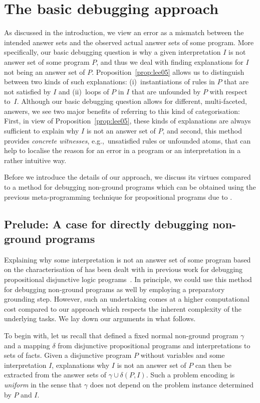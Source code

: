 \documentclass{tlp}
\newcommand{\wrt}{with respect to}
\newcommand{\egc}{e.g.,\ }
\begin{document}
\section{The basic debugging approach}

As discussed in the introduction, 
we view  an error as a mismatch between the intended answer sets and the observed actual answer sets of some program. 
More specifically, our basic debugging question is why a given interpretation $I$ is not answer set of some program $P$, and
thus we deal with  finding explanations for $I$ not being an answer set of $P$.
Proposition~\ref{prop:lee05} allows us to distinguish between two kinds of such explanations:
(i)~instantiations of rules in $P$ that are not satisfied by $I$ and (ii)~loops of $P$ in $I$ that are unfounded by $P$ \wrt\ $I$.
Although our basic debugging question
allows for different, multi-faceted, answers,
we see two major benefits of referring to this kind of  categorisation:
First, in view of Proposition~\ref{prop:lee05}, these kinds of explanations are
always sufficient to explain why $I$ is not an answer set of $P$, and second,
this method provides \emph{concrete witnesses}, \egc unsatisfied rules or unfounded atoms,
that can help to localise the reason for an error in a program or an interpretation in a rather intuitive way.

Before we introduce the details of our approach, we discuss its virtues compared to a method for debugging non-ground programs which can be obtained using the previous meta-programming technique for propositional programs due to .

\subsection{Prelude: A case for directly debugging non-ground programs}

Explaining why some interpretation is not an answer set of some program based on the characterisation of  has been dealt with in previous work for 
debugging propositional disjunctive logic programs~\cite{gebser08}. 
In principle, we could use this method for debugging non-ground programs as well by employing a preparatory  grounding step.
However, such an undertaking comes at a higher computational cost compared to our approach which respects the
inherent complexity of the underlying tasks.
We lay down our arguments in what follows.

To begin with, let us recall that 
defined a fixed normal non-ground program $\gamma$  and a mapping $\delta$ from disjunctive propositional programs  and interpretations 
to sets of facts. 
Given a disjunctive program $P$ without variables and some interpretation $I$, explanations
why $I$ is not an answer set of $P$ can then be extracted from the answer sets of $\gamma \cup \delta(P,I)$. 
Such a problem encoding is 
\emph{uniform} in the sense that $\gamma$ does not depend on the problem instance determined by $P$ and $I$.
\end{document}
